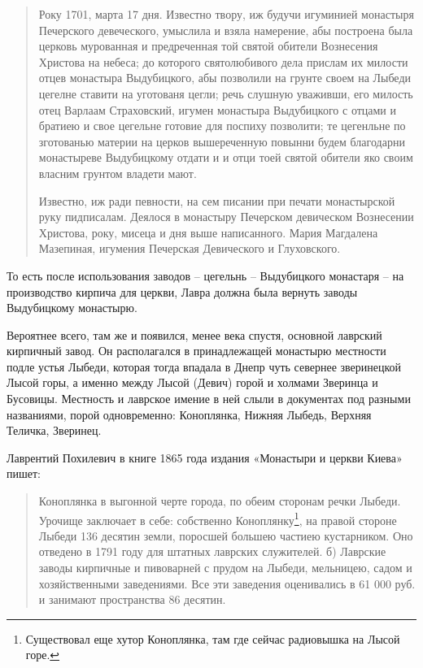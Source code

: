 \begin{quotation}
Року 1701, марта 17 дня. Известно твору, иж будучи игуминией монастыря Печерского девеческого, умыслила и взяла намерение, абы построена была церковь мурованная и предреченная той святой обители Вознесения Христова на небеса; до которого святолюбивого дела прислам их милости отцев монастыра Выдубицкого, абы позволили на грунте своем на Лыбеди цегелне ставити на уготованя цегли; речь слушную уваживши, его милость отец Варлаам Страховский, игумен монастыра Выдубицкого с отцами и братиею и свое цегельне готовие для поспиху позволити; те цегенльне по зготованью материи на церков вышереченную повынни будем благодарни монастыреве Выдубицкому отдати и и отци тоей святой обители яко своим власним грунтом владети мают. 

Известно, иж ради певности, на сем писании при печати монастырской руку пидписалам. Деялося в монастыру Печерском девическом Вознесении Христова, року, мисеца и дня выше написанного. Мария Магдалена Мазепиная, игумения Печерская Девического и Глуховского.\end{quotation}

То есть после использования заводов – цегельнь – Выдубицкого монастаря – на производство кирпича для церкви, Лавра должна была вернуть заводы Выдубицкому монастырю. 

Вероятнее всего, там же и появился, менее века спустя, основной лаврский кирпичный завод. Он располагался в принадлежащей монастырю местности подле устья Лыбеди, которая тогда впадала в Днепр чуть севернее зверинецкой Лысой горы, а именно между Лысой (Девич) горой и холмами Зверинца и Бусовицы. Местность и лаврское имение в ней слыли в документах под разными названиями, порой одновременно: Коноплянка, Нижняя Лыбедь, Верхняя Теличка, Зверинец.

Лаврентий Похилевич в книге 1865 года издания «Монастыри и церкви Киева»\cite{pohilmon} пишет:

\begin{quotation}
Коноплянка в выгонной черте города, по обеим сторонам речки Лыбеди. Урочище заключает в себе: собственно Коноплянку\footnote{Существовал еще хутор Коноплянка, там где сейчас радиовышка на Лысой горе.}, на правой стороне Лыбеди 136 десятин земли, поросшей большею частиею кустарником. Оно отведено в 1791 году для штатных лаврских служителей. б) Лаврские заводы кирпичные и пивоварней с прудом на Лыбеди, мельницею, садом и хозяйственными заведениями. Все эти заведения оценивались в 61 000 руб. и занимают пространства 86 десятин.
\end {quotation}

